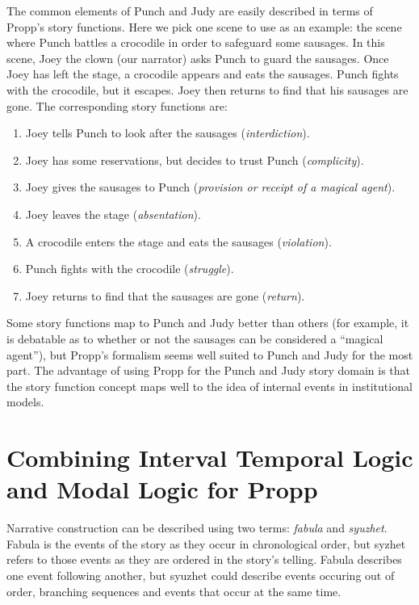 \documentclass{llncs}
\begin{document}
The common elements of Punch and Judy are easily described in terms of Propp's story functions. Here we pick one scene to use as an example: the scene where Punch battles a crocodile in order to safeguard some sausages.  In this scene, Joey the clown (our narrator) asks Punch to guard the sausages. Once Joey has left the stage, a crocodile appears and eats the sausages. Punch fights with the crocodile, but it escapes. Joey then returns to find that his sausages are gone.
The corresponding story functions are:
\begin{enumerate}
  \item Joey tells Punch to look after the sausages (\emph{interdiction}).
  \item Joey has some reservations, but decides to trust Punch (\emph{complicity}).
  \item Joey gives the sausages to Punch (\emph{provision or receipt of a magical agent}).
  \item Joey leaves the stage (\emph{absentation}).
  \item A crocodile enters the stage and eats the sausages (\emph{violation}).
  \item Punch fights with the crocodile (\emph{struggle}).
  \item Joey returns to find that the sausages are gone (\emph{return}).
\end{enumerate}

Some story functions map to Punch and Judy better than others (for example, it is debatable as to whether or not the sausages can be considered a ``magical agent''), but Propp's formalism seems well suited to Punch and Judy for the most part. The advantage of using Propp for the Punch and Judy story domain is that the story function concept maps well to the idea of internal events in institutional models.

\section{Combining Interval Temporal Logic and Modal Logic for Propp}\label{sec:propplogic}
Narrative construction can be described using two terms: \emph{fabula} and \emph{syuzhet}. Fabula is the events of the story as they occur in chronological order, but syzhet refers to those events as they are ordered in the story's telling. Fabula describes one event following another, but syuzhet could describe events occuring out of order, branching sequences and events that occur at the same time.
\end{document}
